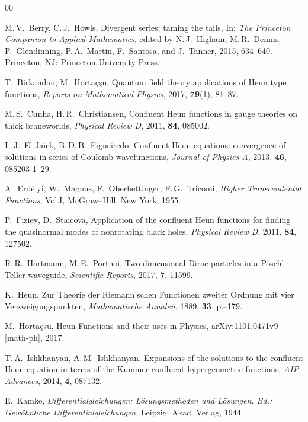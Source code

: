 \documentclass[11pt]{article}
\begin{document}
\begin{thebibliography}{00}

M.\,V.\ Berry,  C.\,J.\ Howls, Divergent series: taming the tails, In: \textit{The Princeton Companion to Applied Mathematics}, edited by N.\,J.~Higham,  M.\,R.~Dennis, P.~Glendinning, P.\,A.~Martin, F.~San\-to\-sa, and J.~Tanner, 2015, 634--640. Princeton, NJ: Princeton University Press.

T.\ Birkandan, M.\ Hortaç\c{s}u,  Quantum field theory applications of Heun type functions,
\textit{Reports on Mathematical Physics}, 2017,
\textbf{79}(1), 81--87.

 M.\,S.\ Cunha, H.\,R.\ Christiansen,
Confluent Heun functions in gauge theories on thick braneworlds,
\textit{Physical Review D}, 2011, \textbf{84}, 085002.

L.\,J.\ El-Jaick,  B.\,D.\,B.\ Figueiredo, Confluent  Heun  equations:  convergence  of  solutions  in  series  of  Coulomb
wavefunctions, \textit{Journal of Physics A}, 2013, \textbf{46}, 085203-1--29.

 A.\ Erd\'{e}lyi, W.\ Magnus, F.\ Oberhettinger, F.\,G.\
Tricomi, \emph{Higher Transcendental Functions}, Vol.\;I, McGraw--Hill, New York, 1955.

P.\ Fiziev, D.\ Staicova, Application of the confluent Heun functions for finding the quasinormal modes
of nonrotating black holes, \textit{Physical Review D}, 2011, \textbf{84}, 127502.

 R.\,R.\ Hartmann, M.\,E.\ Portnoi, Two-dimensional Dirac particles in a P\"{o}schl--Teller
waveguide, \textit{Scientific Reports}, 2017, \textbf{7}, 11599.

 K.\ Heun, Zur Theorie der Riemann'schen Functionen zweiter
Ordnung mit vier Verzweigungs\-punkten, \textit{Mathematische Annalen}, 1889, \textbf{33},
p.\;161--179.

 M.\ Horta\c{c}su, Heun Functions and their uses in Physics,
arXiv:1101.0471v9 [math-ph], 2017.

 T.\,A.\ Ishkhanyan, A.\,M.\ Ishkhanyan, Expansions of the solutions to the confluent
Heun equation in terms of the Kummer confluent hypergeometric functions, \textit{AIP
Advances}, 2014, \textbf{4}, 087132.

 E.\ Kamke, \emph{Differentialgleichungen: L\"osungsmethoden
und L\"osungen. Bd.\;1: Gew\"ohnliche Dif\-fe\-ren\-ti\-al\-glei\-chungen},
Leipzig: Akad. Verlag, 1944.


\end{thebibliography}
\end{document}
